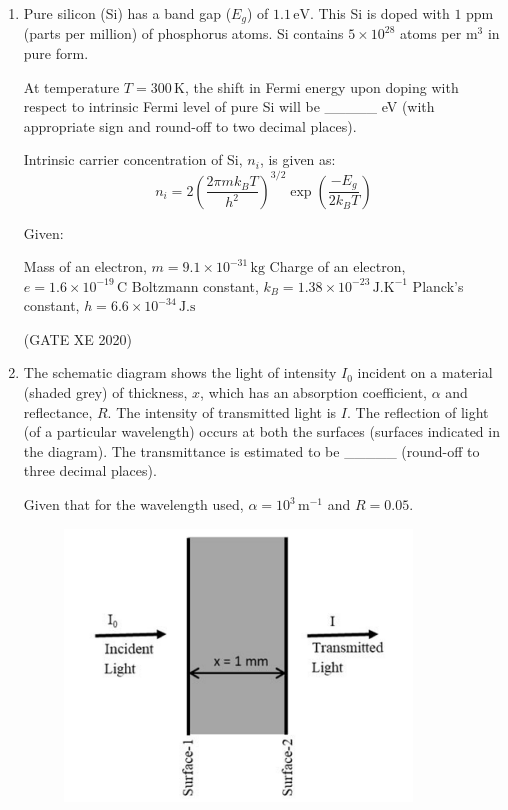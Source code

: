 \documentclass[12pt]{article}
\begin{document}
\begin{enumerate}
(GATE XE 2020)

\item Pure silicon (Si) has a band gap ($E_g$) of $1.1 \,\text{eV}$. This Si is doped with $1$ ppm (parts per million) of phosphorus atoms. Si contains $5 \times 10^{28}$ atoms per m$^3$ in pure form.  

At temperature $T = 300 \,\text{K}$, the shift in Fermi energy upon doping with respect to intrinsic Fermi level of pure Si will be \_\_\_\_\_ eV (with appropriate sign and round-off to two decimal places).  

Intrinsic carrier concentration of Si, $n_i$, is given as:  
$$
n_i = 2 \left(\frac{2 \pi m k_B T}{h^2}\right)^{3/2} \exp\left(\frac{-E_g}{2 k_B T}\right)
$$

Given:  

Mass of an electron, $m = 9.1 \times 10^{-31}\,\text{kg}$  
Charge of an electron, $e = 1.6 \times 10^{-19}\,\text{C}$  
Boltzmann constant, $k_B = 1.38 \times 10^{-23}\,\text{J.K}^{-1}$  
Planck’s constant, $h = 6.6 \times 10^{-34}\,\text{J.s}$  

(GATE XE 2020)

\item The schematic diagram shows the light of intensity $I_0$ incident on a material (shaded grey) of thickness, $x$, which has an absorption coefficient, $\alpha$ and reflectance, $R$. The intensity of transmitted light is $I$. The reflection of light (of a particular wavelength) occurs at both the surfaces (surfaces indicated in the diagram). The transmittance is estimated to be \_\_\_\_\_ (round-off to three decimal places).  

Given that for the wavelength used, $\alpha = 10^3 \,\text{m}^{-1}$ and $R = 0.05$. 

\begin{figure}[H]
    \centering
    \includegraphics[width=0.5\columnwidth]{figs/ass4_c_q17.png}
    \caption{}
    \label{fig:placeholder}
\end{figure}


\end{enumerate}
\end{document}

